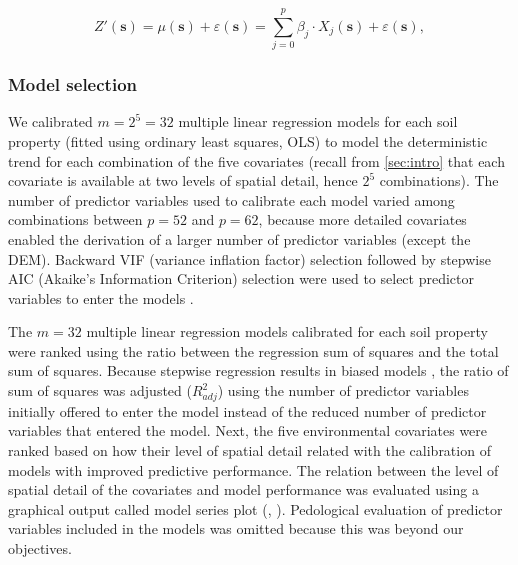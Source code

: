\begin{equation}\label{eq:lmm}
 Z'(\textbf{s}) = \mu(\textbf{s}) + \varepsilon(\textbf{s}) = \sum_{j=0}^{p} 
 \beta_{j}\cdot X_{j}(\textbf{s}) + \varepsilon(\textbf{s}),
\end{equation}


\subsubsection*{Model selection}

We calibrated $m=2^5=32$ multiple linear regression models for each soil property (fitted using ordinary least 
squares, OLS) to model the deterministic trend for each combination of the five covariates (recall from 
\autoref{sec:intro} that each covariate is available at two levels of spatial detail, hence $2^5$ 
combinations). The number of predictor variables used to calibrate each model varied among combinations between 
$p=52$ and $p=62$, because more detailed covariates enabled the derivation of a larger number of predictor 
variables (except the DEM). Backward VIF (variance inflation factor) selection followed by stepwise AIC 
(Akaike's Information Criterion) selection were used to select predictor variables to enter the models 
\cite{Samuel-RosaEtAl2014c, VenablesEtAl2002}.

The $m=32$ multiple linear regression models calibrated for each soil property were ranked using the ratio 
between the regression sum of squares and the total sum of squares. Because stepwise regression results in 
biased models \cite{Harrell2001a}, the ratio of sum of squares was adjusted (${R}^{2}_{adj}$) using the number 
of predictor variables initially offered to enter the model instead of the reduced number of predictor 
variables that entered the model. Next, the five environmental covariates were ranked based on how their level 
of spatial detail related with the calibration of models with improved predictive performance. The relation 
between the level of spatial detail of the covariates and model performance was evaluated using a graphical 
output called model series plot (, ). Pedological 
evaluation of predictor variables included in the models was omitted because this was beyond our objectives.


